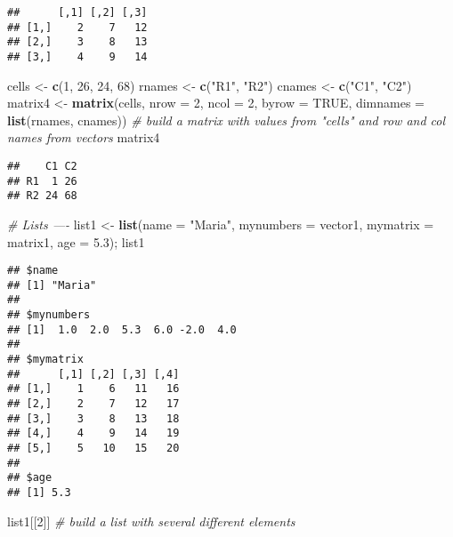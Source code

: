 \documentclass[
]{article}
\newenvironment{Shaded}{\begin{snugshade}}{\end{snugshade}}
\newcommand{\CommentTok}[1]{\textcolor[rgb]{0.56,0.35,0.01}{\textit{#1}}}
\newcommand{\DataTypeTok}[1]{\textcolor[rgb]{0.13,0.29,0.53}{#1}}
\newcommand{\DecValTok}[1]{\textcolor[rgb]{0.00,0.00,0.81}{#1}}
\newcommand{\FloatTok}[1]{\textcolor[rgb]{0.00,0.00,0.81}{#1}}
\newcommand{\KeywordTok}[1]{\textcolor[rgb]{0.13,0.29,0.53}{\textbf{#1}}}
\newcommand{\NormalTok}[1]{#1}
\newcommand{\OtherTok}[1]{\textcolor[rgb]{0.56,0.35,0.01}{#1}}
\newcommand{\StringTok}[1]{\textcolor[rgb]{0.31,0.60,0.02}{#1}}
\begin{document}
\begin{verbatim}
##      [,1] [,2] [,3]
## [1,]    2    7   12
## [2,]    3    8   13
## [3,]    4    9   14
\end{verbatim}

\begin{Shaded}
\begin{Highlighting}[]
\NormalTok{cells <-}\StringTok{ }\KeywordTok{c}\NormalTok{(}\DecValTok{1}\NormalTok{, }\DecValTok{26}\NormalTok{, }\DecValTok{24}\NormalTok{, }\DecValTok{68}\NormalTok{)}
\NormalTok{rnames <-}\StringTok{ }\KeywordTok{c}\NormalTok{(}\StringTok{"R1"}\NormalTok{, }\StringTok{"R2"}\NormalTok{)}
\NormalTok{cnames <-}\StringTok{ }\KeywordTok{c}\NormalTok{(}\StringTok{"C1"}\NormalTok{, }\StringTok{"C2"}\NormalTok{) }
\NormalTok{matrix4 <-}\StringTok{ }\KeywordTok{matrix}\NormalTok{(cells, }\DataTypeTok{nrow =} \DecValTok{2}\NormalTok{, }\DataTypeTok{ncol =} \DecValTok{2}\NormalTok{, }\DataTypeTok{byrow =} \OtherTok{TRUE}\NormalTok{,}
  \DataTypeTok{dimnames =} \KeywordTok{list}\NormalTok{(rnames, cnames)) }\CommentTok{# build a matrix with values from "cells" and row and col names from vectors}
\NormalTok{matrix4}
\end{Highlighting}
\end{Shaded}

\begin{verbatim}
##    C1 C2
## R1  1 26
## R2 24 68
\end{verbatim}

\begin{Shaded}
\begin{Highlighting}[]
\CommentTok{# Lists ---- }
\NormalTok{list1 <-}\StringTok{ }\KeywordTok{list}\NormalTok{(}\DataTypeTok{name =} \StringTok{"Maria"}\NormalTok{, }\DataTypeTok{mynumbers =}\NormalTok{ vector1, }\DataTypeTok{mymatrix =}\NormalTok{ matrix1, }\DataTypeTok{age =} \FloatTok{5.3}\NormalTok{); list1}
\end{Highlighting}
\end{Shaded}

\begin{verbatim}
## $name
## [1] "Maria"
## 
## $mynumbers
## [1]  1.0  2.0  5.3  6.0 -2.0  4.0
## 
## $mymatrix
##      [,1] [,2] [,3] [,4]
## [1,]    1    6   11   16
## [2,]    2    7   12   17
## [3,]    3    8   13   18
## [4,]    4    9   14   19
## [5,]    5   10   15   20
## 
## $age
## [1] 5.3
\end{verbatim}

\begin{Shaded}
\begin{Highlighting}[]
\NormalTok{list1[[}\DecValTok{2}\NormalTok{]] }\CommentTok{# build a list with several different elements}
\end{Highlighting}
\end{Shaded}
\end{document}

